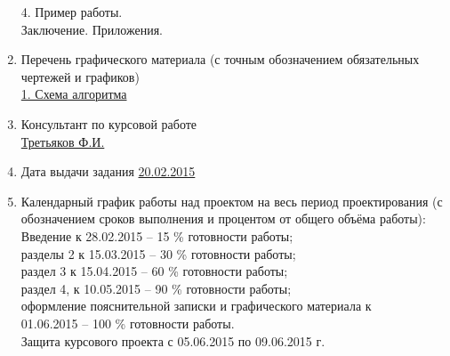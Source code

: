 \documentclass[14pt,a4paper]{extreport}
\begin{document}
\begin{enumerate}
	\underline{\hspace*{16cm}}\hspace*{-16cm}4. Пример работы. \\
	\underline{\hspace*{16cm}}\hspace*{-16cm}Заключение. Приложения. \\
	\item Перечень графического материала (с точным обозначением обязательных чертежей и графиков)\\
	\underline{1. Схема алгоритма}
	\item Консультант по курсовой работе\\
	\underline{Третьяков Ф.И.}  
	\item Дата выдачи задания \underline{20.02.2015}
	\item Календарный график работы над проектом на весь период проектирования (с обозначением сроков выполнения и процентом от общего объёма работы):\\
	\underline{\hspace*{16cm}}\hspace*{-16cm}Введение к 28.02.2015 – 15 \% готовности работы;\\  
	\underline{\hspace*{16cm}}\hspace*{-16cm}разделы 2  к 15.03.2015 – 30 \% готовности работы;\\ 
	\underline{\hspace*{16cm}}\hspace*{-16cm}раздел 3 к 15.04.2015 – 60 \% готовности работы;\\
	\underline{\hspace*{16cm}}\hspace*{-16cm}раздел 4,  к 10.05.2015  –  90 \% готовности работы;\\
	\underline{\hspace*{16cm}}\hspace*{-16cm}оформление пояснительной записки и графического материала к\\
	\underline{\hspace*{16cm}}\hspace*{-16cm}01.06.2015 – 100 \% готовности работы.\\
	\underline{\hspace*{16cm}}\hspace*{-16cm}Защита курсового проекта с 05.06.2015 по 09.06.2015 г.\\
	\end{enumerate}
\end{document}
